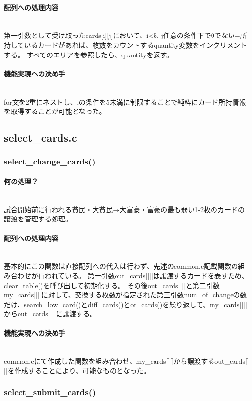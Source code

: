 \documentclass[11pt,a4paper, uplatex]{jsarticle}
\begin{document}
\paragraph{配列への処理内容}\mbox{}\\
第一引数として受け取ったcards[i][j]において、i<5, j任意の条件下で0でない=所持しているカードがあれば、枚数をカウントするquantity変数をインクリメントする。
すべてのエリアを参照したら、quantityを返す。
\paragraph{機能実現への決め手}\mbox{}\\
for文を2重にネストし、iの条件を5未満に制限することで純粋にカード所持情報を取得することが可能となった。
%
\subsection{select\_cards.c}
%
\subsubsection{select\_change\_cards()}
\paragraph{何の処理？}\mbox{}\\
試合開始前に行われる貧民・大貧民→大富豪・富豪の最も弱い1-2枚のカードの譲渡を管理する処理。
\paragraph{配列への処理内容}\mbox{}\\
基本的にこの関数は直接配列への代入は行わず、先述のcommon.c記載関数の組み合わせが行われている。
第一引数out\_cards[][]は譲渡するカードを表すため、clear\_table()を呼び出して初期化する。
その後out\_cards[][]と第二引数my\_cards[][]に対して、交換する枚数が指定された第三引数num\_of\_changeの数だけ、search\_low\_card()とdiff\_cards()とor\_cards()を繰り返して、my\_cards[][]からout\_cards[][]に譲渡する。
\paragraph{機能実現への決め手}\mbox{}\\
common.cにて作成した関数を組み合わせ、my\_cards[][]から譲渡するout\_cards[][]を作成することにより、可能なものとなった。
%
\subsubsection{select\_submit\_cards()}
\end{document}
